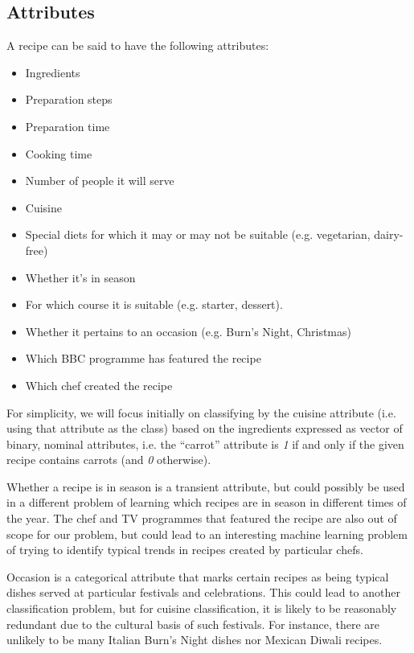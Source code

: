 \documentclass[11pt,a4paper]{article}
\begin{document}
\subsection{Attributes}

A recipe can be said to have the following attributes:

\begin{itemize}
\item Ingredients
\item Preparation steps
\item Preparation time
\item Cooking time
\item Number of people it will serve
\item Cuisine
\item Special diets for which it may or may not be suitable
  (e.g. vegetarian, dairy-free)
\item Whether it's in season
\item For which course it is suitable (e.g. starter, dessert).
\item Whether it pertains to an occasion (e.g. Burn's Night, Christmas)
\item Which BBC programme has featured the recipe
\item Which chef created the recipe
\end{itemize}

For simplicity, we will focus initially on classifying by the cuisine attribute
(i.e. using that attribute as the class) based on the ingredients expressed as
vector of binary, nominal attributes, i.e. the ``carrot'' attribute is
\emph{1} if and only if the given recipe contains carrots (and \emph{0} otherwise).

Whether a recipe is in season is a transient attribute, but could possibly be
used in a different problem of learning which recipes are in season in different
times of the year. The chef and TV programmes that featured the recipe are
also out of scope for our problem, but could lead to an interesting machine
learning problem of trying to identify typical trends in recipes created by
particular chefs.

Occasion is a categorical attribute that marks certain recipes as being typical
dishes served at particular festivals and celebrations. This could lead to
another classification problem, but for cuisine classification, it is likely to
be reasonably redundant due to the cultural basis of such festivals. For
instance, there are unlikely to be many Italian Burn's Night dishes nor Mexican
Diwali recipes.
\end{document}
